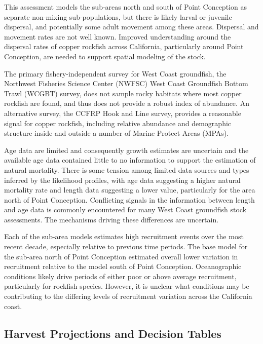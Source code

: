 \documentclass[11pt,
  english,
  letterpaper,
]{article}
\begin{document}
This assessment models the sub-areas north and south of Point Conception as separate non-mixing sub-populations, but there is likely larval or juvenile dispersal, and potentially some adult movement among these areas. Dispersal and movement rates are not well known. Improved understanding around the dispersal rates of copper rockfish across California, particularly around Point Conception, are needed to support spatial modeling of the stock.

The primary fishery-independent survey for West Coast groundfish, the Northwest Fisheries Science Center (NWFSC) West Coast Groundfish Bottom Trawl (WCGBT) survey, does not sample rocky habitats where most copper rockfish are found, and thus does not provide a robust index of abundance. An alternative survey, the CCFRP Hook and Line survey, provides a reasonable signal for copper rockfish, including relative abundance and demographic structure inside and outside a number of Marine Protect Areas (MPAs).

Age data are limited and consequently growth estimates are uncertain and the available age data contained little to no information to support the estimation of natural mortality. There is some tension among limited data sources and types inferred by the likelihood profiles, with age data suggesting a higher natural mortality rate and length data suggesting a lower value, particularly for the area north of Point Conception. Conflicting signals in the information between length and age data is commonly encountered for many West Coast groundfish stock assessments. The mechanisms driving these differences are uncertain.

Each of the sub-area models estimates high recruitment events over the most recent decade, especially relative to previous time periods. The base model for the sub-area north of Point Conception estimated overall lower variation in recruitment relative to the model south of Point Conception. Oceanographic conditions likely drive periods of either poor or above average recruitment, particularly for rockfish species. However, it is unclear what conditions may be contributing to the differing levels of recruitment variation across the California coast.

\hypertarget{harvest-projections-and-decision-tables}{%
\subsection{Harvest Projections and Decision Tables}\label{harvest-projections-and-decision-tables}}
\end{document}
